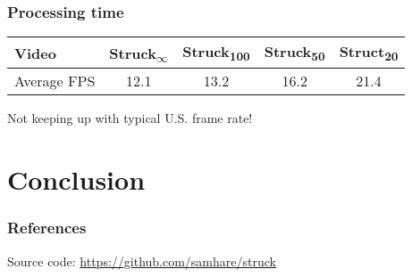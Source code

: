 \documentclass[mathserif,handout]{beamer}
\begin{document}
\begin{frame}
    \frametitle{Processing time}
    \begin{tabular}{l c c c c }
        \toprule
        Video & Struck\textsubscript{$\infty$} & Struck\textsubscript{100} & Struck\textsubscript{50} & Struct\textsubscript{20} \\
        \midrule
        Average FPS & 12.1    & 13.2    & 16.2    & 21.4 \\
        \bottomrule
    \end{tabular}

    Not keeping up with typical U.S. frame rate!
\end{frame}


\section{Conclusion}

\begin{frame}
    \frametitle{References}
    \nocite{*}
    
    

    Source code: \url{https://github.com/samhare/struck}
\end{frame}
\end{document}
